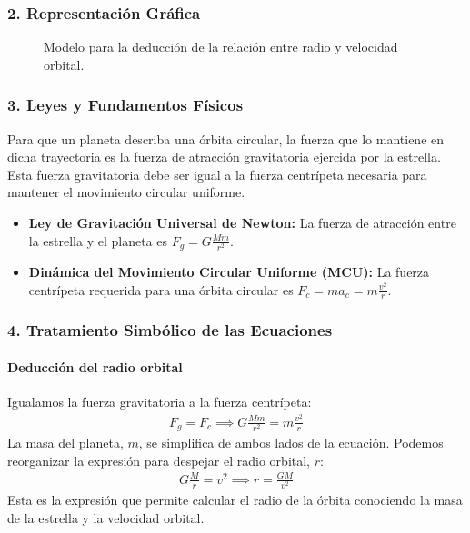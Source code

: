 \subsubsection*{2. Representación Gráfica}
\begin{figure}[H]
    \centering
    \caption{Modelo para la deducción de la relación entre radio y velocidad orbital.}
\end{figure}

\subsubsection*{3. Leyes y Fundamentos Físicos}
Para que un planeta describa una órbita circular, la fuerza que lo mantiene en dicha trayectoria es la fuerza de atracción gravitatoria ejercida por la estrella. Esta fuerza gravitatoria debe ser igual a la fuerza centrípeta necesaria para mantener el movimiento circular uniforme.
\begin{itemize}
    \item \textbf{Ley de Gravitación Universal de Newton:} La fuerza de atracción entre la estrella y el planeta es $F_g = G \frac{M m}{r^2}$.
    \item \textbf{Dinámica del Movimiento Circular Uniforme (MCU):} La fuerza centrípeta requerida para una órbita circular es $F_c = m a_c = m \frac{v^2}{r}$.
\end{itemize}

\subsubsection*{4. Tratamiento Simbólico de las Ecuaciones}
\paragraph*{Deducción del radio orbital}
Igualamos la fuerza gravitatoria a la fuerza centrípeta:
\begin{gather}
    F_g = F_c \implies G \frac{M m}{r^2} = m \frac{v^2}{r}
\end{gather}
La masa del planeta, $m$, se simplifica de ambos lados de la ecuación. Podemos reorganizar la expresión para despejar el radio orbital, $r$:
\begin{gather}
    G \frac{M}{r} = v^2 \implies r = \frac{G M}{v^2}
\end{gather}
Esta es la expresión que permite calcular el radio de la órbita conociendo la masa de la estrella y la velocidad orbital.

